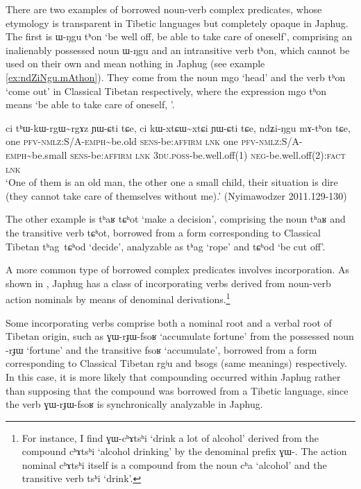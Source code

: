 \documentclass[oldfontcommands,oneside,a4paper,11pt]{article}
\newcommand{\ipa}[1]{{\phon \mbox{#1}}} %
\begin{document}
There are two examples of borrowed noun-verb complex predicates, whose etymology is transparent in Tibetic languages but completely opaque in Japhug. The first is \ipa{ɯ-ŋgu} \ipa{tʰon} `be well off, be able to take care of oneself', comprising an inalienably possessed noun \ipa{ɯ-ŋgu} and an intransitive verb \ipa{tʰon}, which cannot be used on their own and mean nothing in Japhug (see example \ref{ex:ndZiNgu.mAthon}). They come from the noun \ipa{mgo} `head' and the verb \ipa{tʰon} `come out' in Classical Tibetan respectively, where the expression \ipa{mgo} \ipa{tʰon} means `be able to take care of oneself, '.


\begin{exe}
\ex \label{ex:ndZiNgu.mAthon}
\gll
\ipa{ci}  	\ipa{tʰɯ-kɯ-rgɯ\textasciitilde{}rgɤz}  	\ipa{ɲɯ-ɕti}  	\ipa{tɕe,}  	\ipa{ci}  	\ipa{kɯ-xtɕɯ\textasciitilde{}xtɕi}  	\ipa{ɲɯ-ɕti}  	\ipa{tɕe,}  	\ipa{ndʑi-ŋgu}  	\ipa{mɤ-tʰon}  	\ipa{tɕe,}  	  \\
one \textsc{pfv-nmlz}:S/A-\textsc{emph}\textasciitilde{}be.old \textsc{sens}-be:\textsc{affirm} \textsc{lnk} one \textsc{pfv-nmlz}:S/A-\textsc{emph}\textasciitilde{}be.small \textsc{sens}-be:\textsc{affirm} \textsc{lnk} \textsc{3du.poss}-be.well.off(1) \textsc{neg}-be.well.off(2):\textsc{fact} \textsc{lnk} \\
\glt `One of them is an old man, the other one a small child, their situation is dire (they cannot take care of themselves without me).' (Nyimawodzer 2011.129-130)
\end{exe}  

The other example is \ipa{tʰaʁ} \ipa{tɕʰot} `make a decision', comprising the noun \ipa{tʰaʁ} and the transitive verb \ipa{tɕʰot}, borrowed from a form corresponding to Classical Tibetan  \ipa{tʰag tɕʰod} `decide', analyzable as \ipa{tʰag} `rope' and \ipa{tɕʰod} `be cut off'.

A more common type of borrowed complex predicates involves incorporation. As shown in \citet{jacques12incorp}, Japhug has a class of incorporating verbs derived from noun-verb action nominals by means of denominal derivations.\footnote{For instance, I find \ipa{ɣɯ-cʰɤtsʰi} `drink a lot of alcohol' derived from the compound \ipa{cʰɤtsʰi} `alcohol drinking' by the denominal prefix \ipa{ɣɯ-}. The action nominal \ipa{cʰɤtsʰi} itself is a compound from the noun \ipa{cʰa} `alcohol' and the transitive verb \ipa{tsʰi} `drink'.}

Some incorporating verbs comprise both a nominal root and a verbal root of Tibetan origin, such as \ipa{ɣɯ-rɟɯ-fsoʁ} `accumulate fortune' from the possessed noun \ipa{-rɟɯ} `fortune' and the transitive \ipa{fsoʁ} `accumulate', borrowed from a form corresponding to Classical Tibetan \ipa{rgʲu} and \ipa{bsogs} (same meanings) respectively. In this case, it is more likely that compounding occurred within Japhug rather than supposing that the compound was borrowed from a Tibetic language, since the verb \ipa{ɣɯ-rɟɯ-fsoʁ} is synchronically analyzable in Japhug.
\end{document}
